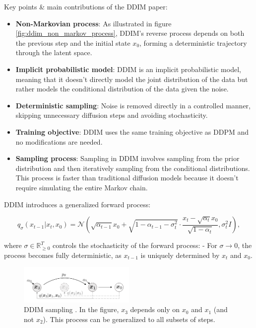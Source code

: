 Key points \& main contributions of the DDIM paper:

\begin{itemize}
    \item \textbf{Non-Markovian process}: As illustrated in figure \ref{fig:ddim_non_markov_process}, DDIM's reverse process depends on both the previous step and the initial state $x_0$, forming a deterministic trajectory through the latent space.
    \item \textbf{Implicit probabilistic model}: DDIM is an implicit probabilistic model, meaning that it doesn't directly model the joint distribution of the data but rather models the conditional distribution of the data given the noise.
    \item \textbf{Deterministic sampling}: Noise is removed directly in a controlled manner, skipping unnecessary diffusion steps and avoiding stochasticity.
    \item \textbf{Training objective}: DDIM uses the same training objective as DDPM and no modifications are needed.
    \item \textbf{Sampling process}: Sampling in DDIM involves sampling from the prior distribution and then iteratively sampling from the conditional distributions. This process is faster than traditional diffusion models because it doesn't require simulating the entire Markov chain.
\end{itemize}

DDIM introduces a generalized forward process:

\[
q_\sigma (x_{t-1} | x_t, x_0) = \mathcal{N} \left( \sqrt{\alpha_{t-1}} x_0 + \sqrt{1 - \alpha_{t-1} - \sigma_t^2} \cdot \frac{x_t - \sqrt{\alpha_t} x_0}{\sqrt{1 - \alpha_t}}, \sigma_t^2 I \right),
\]

where $\sigma \in \mathbb{R}^T_{\geq 0}$ controls the stochasticity of the forward process:
- For $\sigma \rightarrow 0$, the process becomes fully deterministic, as $x_{t-1}$ is uniquely determined by $x_t$ and $x_0$.

\begin{figure}
    \centering
    \includegraphics[width=0.5\textwidth]{images/diffusion_models/stable_diffusion/ddim_sampling_process.png}
    \caption{DDIM sampling \cite{ddim}. In the figure, $x_3$ depends only on $x_0$ and $x_1$ (and not $x_2$). This process can be generalized to all subsets of steps.}
    \label{fig:ddim_sampling_process}
\end{figure}


